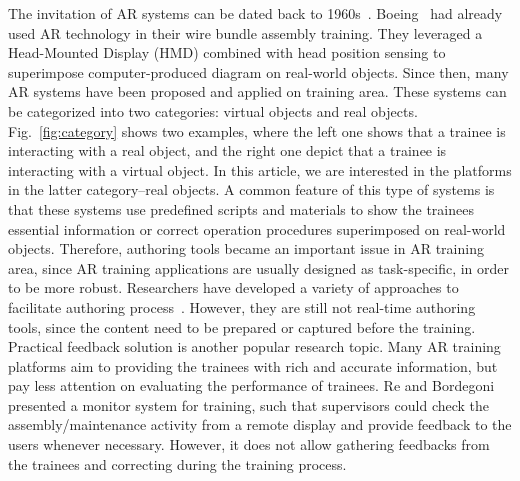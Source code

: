The invitation of AR systems can be dated back to 1960s~\cite{sutherland1968,johnson2010, yuen2011}. Boeing~\cite{caudell1992} had already used AR technology in their wire bundle assembly training. They leveraged a Head-Mounted Display (HMD) combined with head position sensing to superimpose computer-produced diagram on real-world objects. Since then, many AR systems have been proposed and applied on training area. These systems can be categorized into two categories: virtual objects and real objects. Fig.~\ref{fig:category} shows two examples, where the left one shows that a trainee is interacting with a real object, and the right one depict that a trainee is interacting with a virtual object. In this article, we are interested in the platforms in the latter category--real objects. A common feature of this type of systems is that these systems use predefined scripts and materials to show the trainees essential information or correct operation procedures superimposed on real-world objects.
Therefore, authoring tools became an important issue in AR training area, since AR training applications are usually designed as task-specific, in order to be more robust.
Researchers have developed a variety of approaches to facilitate authoring process~\cite{wang2010,petersen2012,anderson2013,bhattacharya2015}.
However, they are still not real-time authoring tools, since the content need to be prepared or captured before the training.
Practical feedback solution is another popular research topic. Many AR training platforms aim to providing the trainees with rich and accurate information, but pay less attention on evaluating the performance of trainees. Re and Bordegoni~\cite{re2014} presented a monitor system for training, such that supervisors could check the assembly/maintenance activity from a remote display and provide feedback to the users whenever necessary. However, it does not allow gathering feedbacks from the trainees and correcting during the training process.



